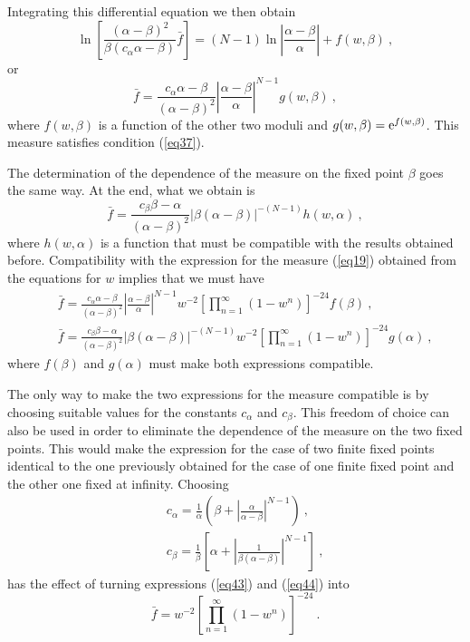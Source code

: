 \documentclass[a4paper,12pt]{article}
\begin{document}
Integrating this differential equation we then obtain
\begin{equation}
\ln \left[ \frac{(\alpha -\beta )^2}{\beta (c_\alpha \alpha -\beta )}\bar f\right] =(N-1)\ln \left| \frac{\alpha -\beta }{\alpha }\right| +f(w,\beta ) \ ,
\end{equation}
or
\begin{equation}
\bar f=\frac{c_\alpha \alpha -\beta }{(\alpha -\beta )^2}\left| \frac{\alpha -\beta }{\alpha }\right| ^{N-1}g(w,\beta ) \ ,
\end{equation}
where $f(w,\beta )$ is a function of the other two moduli and $g(w,\beta )={\rm e}^{f(w,\beta )}$. This measure satisfies condition (\ref{eq37}).

The determination of the dependence of the measure on the fixed point $\beta $ goes the same way. At the end, what we obtain is
\begin{equation}
\bar f=\frac{c_\beta \beta -\alpha }{(\alpha -\beta )^2}\left| \beta (\alpha -\beta )\right| ^{-(N-1)}h(w,\alpha ) \ ,
\end{equation}
where $h(w,\alpha )$ is a function that must be compatible with the results obtained before. Compatibility with the expression for the measure (\ref{eq19}) obtained from the equations for $w$ implies that we must have
\begin{eqnarray}
\label{eq43}
 & & \bar f=\frac{c_\alpha \alpha -\beta }{(\alpha -\beta )^2}\left| \frac{\alpha -\beta }{\alpha }\right| ^{N-1}w^{-2}\left[ \prod_{n=1}^\infty (1-w^n)\right] ^{-24}f(\beta ) \ ,\\ \label{eq44}
 & & \bar f=\frac{c_\beta \beta -\alpha }{(\alpha -\beta )^2}\left| \beta (\alpha -\beta )\right| ^{-(N-1)}w^{-2}\left[ \prod_{n=1}^\infty (1-w^n)\right] ^{-24}g(\alpha ) \ ,
\end{eqnarray}
where $f(\beta )$ and $g(\alpha )$ must make both expressions compatible. 

The only way to make the two expressions for the measure compatible is by choosing suitable values for the constants $c_\alpha $ and $c_\beta $. This freedom of choice can also be used in order to eliminate the dependence of the measure on the two fixed points. This would make the expression for the case of two finite fixed points identical to the one previously obtained for the case of one finite fixed point and the other one fixed at infinity. Choosing
\begin{eqnarray}
 & & c_\alpha =\frac{1}{\alpha }\left( \beta +\left| \frac{\alpha }{\alpha -\beta }\right| ^{N-1}\right) \ ,\\ 
 & & c_\beta =\frac{1}{\beta }\left[ \alpha +\left| \frac{1}{\beta (\alpha -\beta )}\right| ^{N-1}\right] \ ,
\end{eqnarray}
has the effect of turning expressions (\ref{eq43}) and (\ref{eq44}) into
\begin{equation}
\bar f=w^{-2}\left[ \prod_{n=1}^\infty (1-w^n)\right] ^{-24}\ .
\end{equation}
\end{document}
